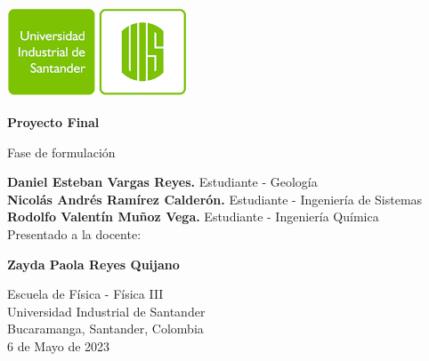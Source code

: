 \begin{titlepage}
    \begin{center}
        \includegraphics[width=0.4\textwidth]{../../general-images/uis-logo.png}
        
        \vspace{0.5cm}
        \LARGE
        \textbf{Proyecto Final}
        
        \vspace{0.5cm}
        \large
        Fase de formulación
        
        \vfill
        
        \textbf{Daniel Esteban Vargas Reyes.} Estudiante - Geología\\
        \textbf{Nicolás Andrés Ramírez Calderón.} Estudiante - Ingeniería de Sistemas\\ 
        \textbf{Rodolfo Valentín Muñoz Vega.} Estudiante - Ingeniería Química\\

        \vspace{1.0cm}
        Presentado a la docente:
        
        \textbf{Zayda Paola Reyes Quijano}
        
        \vfill
        
        Escuela de Física - Física III\\
        Universidad Industrial de Santander\\
        Bucaramanga, Santander, Colombia\\
        6 de Mayo de 2023
    \end{center}
\end{titlepage}
